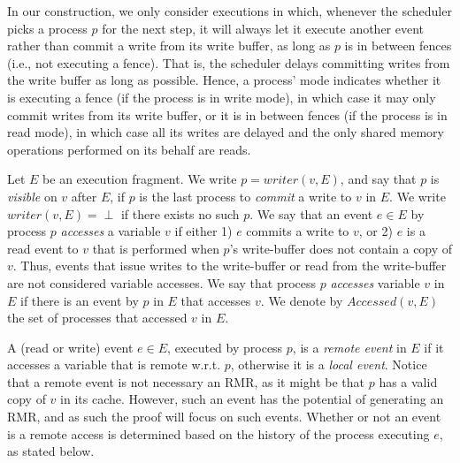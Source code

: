 In our construction, we only consider executions in which, whenever the scheduler picks a process $p$ for the next step, it will always let it execute another event rather than commit a write from its write buffer,
as long as $p$ is in between fences (i.e., not executing a fence). That is, the scheduler delays committing writes from the write buffer as long as possible. Hence, a process' mode indicates whether it is executing a fence (if the process is in write mode), in which case it may only commit writes from its write buffer, or it is in between fences (if the process is in read mode), in which case all its writes are delayed
and the only shared memory operations performed on its behalf are reads.

Let $E$ be an execution fragment. We write $p = writer(v,E)$, and say that $p$ is \emph{visible} on $v$ after $E$, if $p$ is the last process
to \emph{commit} a write to $v$ in $E$. We write $writer(v,E) = \perp$ if there exists no such $p$.
We say that an event $e \in E$ by process $p$ \emph{accesses} a variable $v$ if either 1) $e$ commits a write to $v$,
or 2) $e$ is a read event to $v$ that is performed when $p$'s write-buffer does not contain a copy of $v$.
Thus, events that issue writes to the write-buffer or read from the write-buffer are not considered variable accesses.
We say that process $p$ \emph{accesses} variable $v$ in $E$ if there is an event by $p$ in $E$ that accesses $v$. We denote by $Accessed(v,E)$ the set of processes that accessed $v$ in $E$.

A (read or write) event $e \in E$, executed by process $p$, is a \emph{remote event} in $E$ if it accesses a variable that
is remote w.r.t. $p$, otherwise it is a \emph{local event}.
Notice that a remote event is not necessary an RMR, as it might be that $p$ has a valid copy of $v$ in its cache. However, such an event has the potential of generating an RMR, and as such the proof will focus on such events.
Whether or not an event is a remote access is determined based on the history
of the process executing $e$, as stated below.

